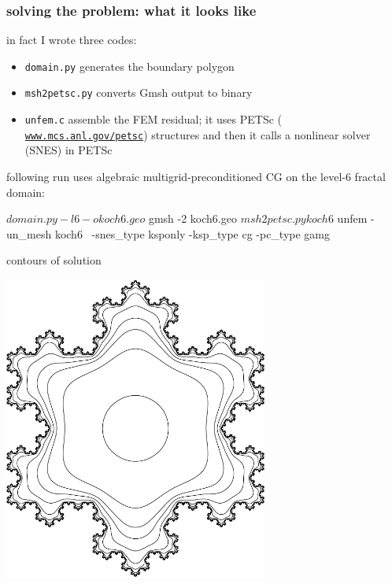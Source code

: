 \documentclass[hide notes,intlimits,usenames,dvipsnames]{beamer}
\begin{document}
\begin{frame}[fragile]
\frametitle{solving the problem: what it looks like}

in fact I wrote three codes:
\begin{itemize}
\item \texttt{domain.py} generates the boundary polygon
\item \texttt{msh2petsc.py} converts Gmsh output to binary
\item \texttt{unfem.c} assemble the FEM residual; it uses PETSc (\href{https://www.mcs.anl.gov/petsc/}{\color{blue} \texttt{www.mcs.anl.gov/petsc}}) structures and then it calls a nonlinear solver (SNES) in PETSc
\end{itemize}

\medskip
following run uses algebraic multigrid-preconditioned CG on the level-6 fractal domain:
\begin{cline}
$ domain.py -l 6 -o koch6.geo
$ gmsh -2 koch6.geo
$ msh2petsc.py koch6
$ unfem -un_mesh koch6 \
    -snes_type ksponly -ksp_type cg -pc_type gamg
\end{cline}
\end{frame}


\begin{frame}{contours of solution}
\begin{center}
\includegraphics[width=0.65\textwidth]{snowflake}
\end{center}
\end{frame}
\end{document}
